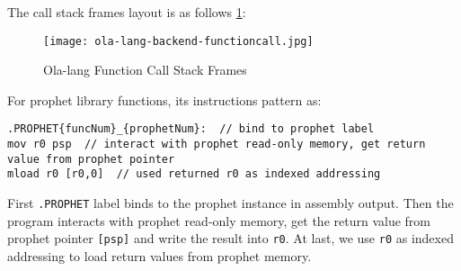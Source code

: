 The call stack frames layout is as follows \ref{fig:ola-lang-backend-functioncall}:

\begin{figure}[!htp]
    \centering
    \texttt{[image: ola-lang-backend-functioncall.jpg]}
    \caption{Ola-lang Function Call Stack Frames}
    \label{fig:ola-lang-backend-functioncall}
\end{figure}

For prophet library functions, its instructions pattern as:
\begin{lstlisting}[language={}]
.PROPHET{funcNum}_{prophetNum}:  // bind to prophet label
mov r0 psp  // interact with prophet read-only memory, get return value from prophet pointer
mload r0 [r0,0]  // used returned r0 as indexed addressing
\end{lstlisting}

First \texttt{.PROPHET} label binds to the prophet instance in assembly output.
Then the program interacts with prophet read-only memory, get the return value from prophet pointer \texttt{[psp]} and write the result into \texttt{r0}.
At last, we use \texttt{r0} as indexed addressing to load return values from prophet memory.